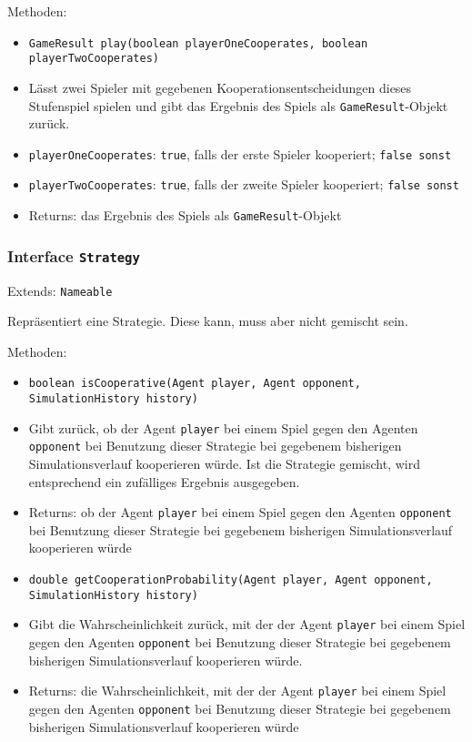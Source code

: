 \documentclass[parskip=full,11pt]{scrartcl}
\begin{document}
Methoden:
\begin{itemize}\itemsep -10pt
\item[] \texttt{GameResult play(boolean playerOneCooperates, boolean playerTwoCooperates)}
\item[] Lässt zwei Spieler mit gegebenen Kooperationsentscheidungen dieses Stufenspiel spielen und gibt das Ergebnis des Spiels als \texttt{GameResult}-Objekt zurück.
\item[] \texttt{playerOneCooperates}: \texttt{true}, falls der erste Spieler kooperiert; \texttt{false sonst}
\item[] \texttt{playerTwoCooperates}: \texttt{true}, falls der zweite Spieler kooperiert; \texttt{false sonst}
\item[] Returns: das Ergebnis des Spiels als \texttt{GameResult}-Objekt
\end{itemize}

\subsubsection{Interface \texttt{Strategy}}
Extends: \texttt{Nameable}

Repräsentiert eine Strategie. Diese kann, muss aber nicht gemischt sein.

Methoden:
\begin{itemize}\itemsep -10pt
\item \texttt{boolean isCooperative(Agent player, Agent opponent, SimulationHistory history)}
\item[] Gibt zurück, ob der Agent \texttt{player} bei einem Spiel gegen den Agenten \texttt{opponent} bei Benutzung dieser Strategie bei gegebenem bisherigen Simulationsverlauf kooperieren würde. Ist die Strategie gemischt, wird entsprechend ein zufälliges Ergebnis ausgegeben.
\item[] Returns: ob der Agent \texttt{player} bei einem Spiel gegen den Agenten \texttt{opponent} bei Benutzung dieser Strategie bei gegebenem bisherigen Simulationsverlauf kooperieren würde

\item \texttt{double getCooperationProbability(Agent player, Agent opponent, SimulationHistory history)}
\item[] Gibt die Wahrscheinlichkeit zurück, mit der der Agent \texttt{player} bei einem Spiel gegen den Agenten \texttt{opponent} bei Benutzung dieser Strategie bei gegebenem bisherigen Simulationsverlauf kooperieren würde.
\item[] Returns: die Wahrscheinlichkeit, mit der der Agent \texttt{player} bei einem Spiel gegen den Agenten \texttt{opponent} bei Benutzung dieser Strategie bei gegebenem bisherigen Simulationsverlauf kooperieren würde
\end{itemize}
\end{document}
